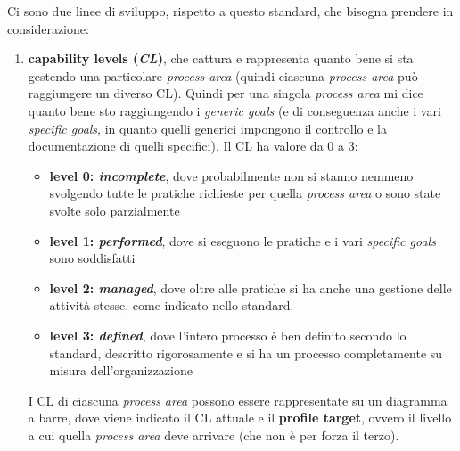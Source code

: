 Ci sono due linee di sviluppo, rispetto a questo standard, che bisogna prendere in considerazione:
\begin{enumerate}
    \item \textbf{capability levels (\textit{CL})}, che cattura e rappresenta quanto bene si sta gestendo una particolare \textit{process area} (quindi ciascuna \textit{process area} può raggiungere un diverso CL). Quindi per una singola \textit{process area} mi dice quanto bene sto raggiungendo i \textit{generic goals} (e di conseguenza anche i vari \textit{specific goals}, in quanto quelli generici impongono il controllo e la documentazione di quelli specifici). 
    Il CL ha valore da 0 a 3: 
        \begin{itemize} 
            \item \textbf{level 0: \textit{incomplete}}, dove probabilmente non si stanno nemmeno svolgendo tutte le pratiche richieste per quella \textit{process area} o sono state svolte solo parzialmente 
            \item \textbf{level 1: \textit{performed}}, dove si eseguono le pratiche e i vari \textit{specific goals} sono soddisfatti 
            \item \textbf{level 2: \textit{managed}}, dove oltre alle pratiche si ha anche una gestione delle attività stesse, come indicato nello standard.
            \item \textbf{level 3: \textit{defined}}, dove l'intero processo è ben definito secondo lo standard, descritto rigorosamente e si ha un processo completamente su misura dell'organizzazione 
        \end{itemize} 
    I CL di ciascuna \textit{process area} possono essere rappresentate su un diagramma a barre, dove viene indicato il CL attuale e il \textbf{profile target}, ovvero il livello a cui quella \textit{process area} deve arrivare (che non è per forza il terzo). 
    

\end{enumerate}
